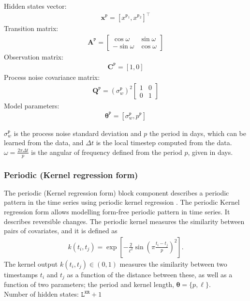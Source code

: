 Hidden states vector: 
\begin{gather*}
\mathbf{x}^{\mathtt{P}} = [x^{\mathtt{P}_ {1}}, x^{\mathtt{P}_{2}}]^{\intercal}
\end{gather*}
Transition matrix: 
\begin{gather*}
\mathbf{A}^{\mathtt{P}}= \left[\begin{array}{cc}\cos \omega &\sin \omega\\-\sin \omega&\cos \omega\end{array}\right]
\end{gather*}
Observation matrix: 
\begin{gather*}
\mathbf{C}^{\mathtt{P}}=[1, 0]
\end{gather*}
Process noise covariance matrix:
\begin{gather*}
\mathbf{Q}^{\mathtt{P}}=(\sigma_{w}^{\mathtt{P}})^{2}\left[\begin{array}{cc}1 &0\\0&1\end{array}\right]
\end{gather*}
Model parameters: 
\begin{gather*}
\bm\theta^{\mathtt{P}}=[\sigma_{w}^{\mathtt{P}}, p^{\mathtt{P}} ]
\end{gather*}

\noindent
$\sigma_{w}^{\mathtt{P}}$ is the process noise standard deviation and $p$ the period in days, which can be learned from the data, and $\Delta t$ is the local timestep computed from the data.
 $\omega=\frac{2\pi \Delta t}{p}$ is the angular of frequency defined from the period $p$, given in days.


\subsubsection{Periodic (Kernel regression form)}

The periodic (Kernel regression form) block component describes a periodic pattern in the time series using periodic kernel regression  \cite{Nguyen2019KRBDLM}. 
The periodic Kernel regression form allows modelling form-free periodic pattern in time series.
It describes reversible changes.
The periodic kernel measures the similarity between pairs of covariates, and it is defined as
\begin{gather*}
k(t_{i},t_{j})=\exp\left[-\frac{2}{\ell^2}\sin\left( \pi\frac{t_i-t_{j}}{p}\right)^{2}\right].
\end{gather*}
The kernel output $k(t_{i},t_{j})\in(0,1)$ measures the similarity between two timestamps $t_{i}$ and $t_{j}$ as a function of the distance between these, as well as a function of two parameters; the period and kernel length, $\bm{\theta}=\{p,\ell\}$.
\noindent\\
Number of hidden states:  $\mathtt{L}^{\mathtt{KR}}+1$\\

